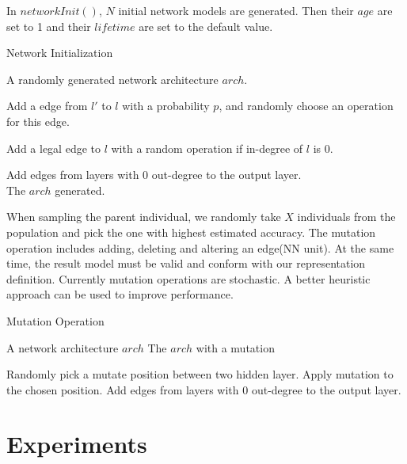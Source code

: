 \documentclass[conference]{IEEEtran}
\begin{document}
In $networkInit()$, $N$ initial network models are generated. Then their $age $ are set to 1 and their $lifetime$ are set to the default value. 

 \begin{algorithm}[H]  
	\caption{ Network Initialization}
	
	
	\begin{algorithmic}[1]  
		\Ensure A randomly generated network architecture $arch$.
		
		\State Add a edge from $l'$ to $l$ with a probability $p$, and randomly choose an operation for this edge.
		\EndFor

				\State  Add a legal edge to $l$ with a random operation if in-degree of $l$ is 0.
		\EndIf

		\EndFor
		
		\State Add edges from layers with 0 out-degree to the output layer.
		\\
		\Return The $arch$ generated.
		
	\end{algorithmic}  
\end{algorithm}  

  When sampling the parent individual, we randomly take $X$ individuals from the population and pick the one with highest estimated accuracy. The mutation operation includes adding, deleting and altering an edge(NN unit). At the same time, the result model must be valid and conform with our representation definition. Currently mutation operations are stochastic. A better heuristic approach can be used to improve performance.

 \begin{algorithm}[H]  
	\caption{ Mutation Operation}
 

	\begin{algorithmic}[1]  
	\Require A network architecture $arch$
	\Ensure The $arch$ with a mutation
	
	
		\State Randomly pick a mutate position between two hidden layer.
		\State Apply mutation to the chosen position. 
		\EndWhile
		\State Add edges from layers with 0 out-degree to the output layer.
		
	\end{algorithmic}  
\end{algorithm}  

 \section{Experiments}
\end{document}
